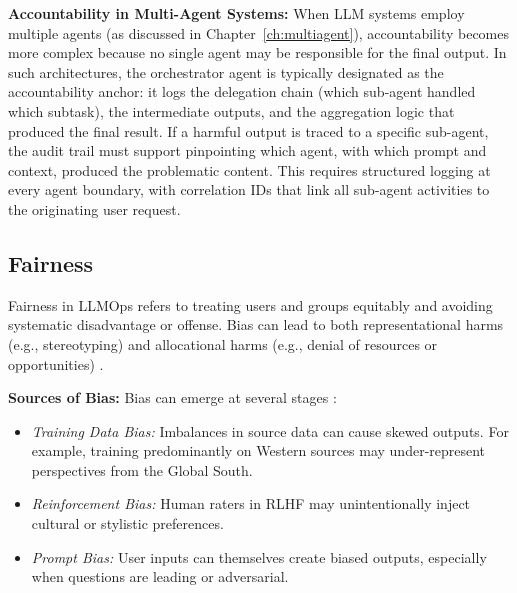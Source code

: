 \textbf{Accountability in Multi-Agent Systems:} When LLM systems employ multiple agents (as discussed in Chapter~\ref{ch:multiagent}), accountability becomes more complex because no single agent may be responsible for the final output. In such architectures, the orchestrator agent is typically designated as the accountability anchor: it logs the delegation chain (which sub-agent handled which subtask), the intermediate outputs, and the aggregation logic that produced the final result. If a harmful output is traced to a specific sub-agent, the audit trail must support pinpointing which agent, with which prompt and context, produced the problematic content. This requires structured logging at every agent boundary, with correlation IDs that link all sub-agent activities to the originating user request.


\subsection{Fairness}

Fairness in LLMOps refers to treating users and groups equitably and avoiding systematic disadvantage or offense. Bias can lead to both representational harms (e.g., stereotyping) and allocational harms (e.g., denial of resources or opportunities) \cite{ar5iv_labs}.

\textbf{Sources of Bias:} Bias can emerge at several stages \cite{ar5iv_labs,aclanthology2023}:
\begin{itemize}
    \item \emph{Training Data Bias:} Imbalances in source data can cause skewed outputs. For example, training predominantly on Western sources may under-represent perspectives from the Global South.
    \item \emph{Reinforcement Bias:} Human raters in RLHF may unintentionally inject cultural or stylistic preferences.
    \item \emph{Prompt Bias:} User inputs can themselves create biased outputs, especially when questions are leading or adversarial.
\end{itemize}

